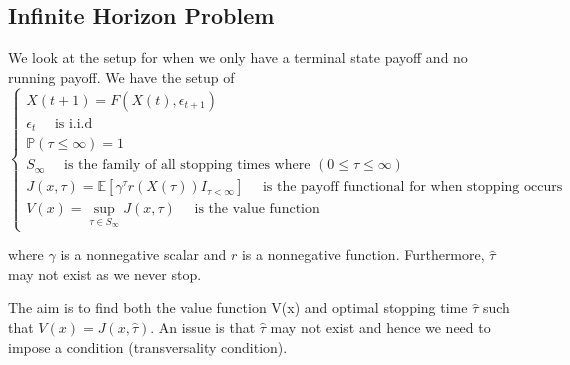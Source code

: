 \documentclass[twoside]{article}
\begin{document}
\subsection{Infinite Horizon Problem}
We look at the setup for when we only have a terminal state payoff and no running payoff. We have the setup of 
$$
\begin{cases}
X(t+1) = F(X(t), \epsilon_{t+1}) \\
\epsilon_t \quad \text{ is i.i.d}\\
\mathbb{P}(\tau \leq \infty) = 1 \\
S_{\infty} \quad \text{ is the family of all stopping times where } (0 \leq \tau \leq \infty)\\
J(x,\tau) = \mathbb{E}[\gamma^{\tau}r(X(\tau))I_{\tau < \infty}] \quad \text{ is the payoff functional for when stopping occurs}\\
V(x) = \sup_{\tau \in S_{\infty}}J(x,\tau) \quad \text{ is the value function}
\end{cases}
$$

where $\gamma$ is a nonnegative scalar and $r$ is a nonnegative function. Furthermore, $\hat{\tau}$ may not exist as we never stop.

The aim is to find both the value function V(x) and optimal stopping time $\hat{\tau}$ such that $V(x) = J(x,\hat{\tau})$. An issue is that $\hat{\tau}$ may not exist and hence we need to impose a condition (transversality condition).\\
\end{document}
